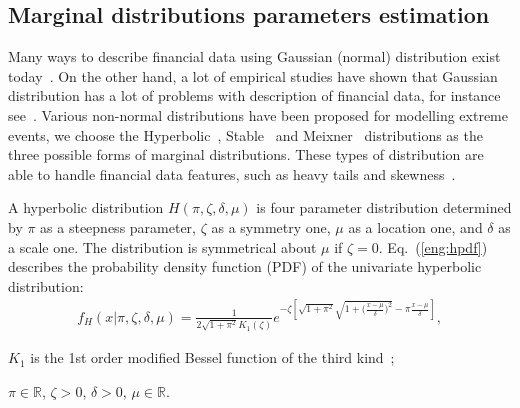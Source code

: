 \subsection*{Marginal distributions parameters estimation}

Many ways to describe financial data using Gaussian (normal) distribution exist today~\cite{Json1949}. 
On the other hand, a lot of empirical studies have shown that Gaussian distribution has a lot of problems with description of financial data, for instance see~\cite{Limp2011, Rachev2005, Wilmott2007}. 
Various non-normal distributions have been proposed for modelling extreme events, we choose the Hyperbolic~\cite{Barndoff1983}, Stable~\cite{Nolan2009, Rachev2005, Stoyanov2013} and Meixner~\cite{Schoutens2002} distributions as the three possible forms of marginal distributions.
These types of distribution are able to handle financial data features, such as heavy tails and skewness~\cite{Stoyanov2013}. 

A hyperbolic distribution $H(\pi, \zeta, \delta, \mu)$ is four parameter distribution \cite{Barndoff1983} determined by $\pi$ as a steepness parameter, $\zeta$ as a symmetry one, $\mu$ as a location one, and $\delta$ as a scale one.
The distribution is symmetrical about
$\mu$ if $\zeta=0$.
Eq.~(\ref{eng:hpdf}) describes the probability density function (PDF) of the univariate hyperbolic distribution:
\begin{eqnarray}\label{eng:hpdf} 
f_H(x|\pi,\zeta,\delta,\mu)=\frac{1}{2 \sqrt{1+\pi^2} 
K_1(\zeta) }e^{-\zeta \left[ \sqrt{1+\pi^2}
\sqrt{1+\big(\frac{x-\mu}{\delta})^2}-
\pi\frac{x-\mu}{\delta}\right]},
\end{eqnarray}
\begin{where*}
    \item $K_1$ is the 1st order modified Bessel function of the third kind~\cite{Bessel1824};
    \item $\pi \in \mathbb{R}$, $\zeta > 0$, $\delta > 0$, $\mu \in \mathbb{R}$.
\end{where*}

